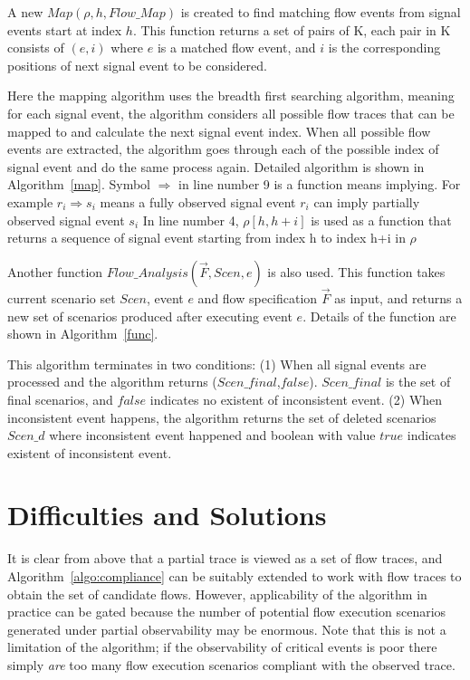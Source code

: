 \documentclass[12pt,frontmatter,copyright,thesis]{usfmanus}
\begin{document}
A new $Map(\rho, h, Flow\_Map)$ is created
to find matching flow events from 
signal events start at index $h$.
This function returns a set of pairs of K, each pair in K
consists of $(e, i)$ where $e$
is a matched flow event,
and $i$ is the corresponding positions of next signal event
to be considered. 

Here the mapping algorithm uses the breadth first searching algorithm,
meaning for each signal event, the algorithm considers all
possible flow traces that can be mapped to and calculate the next signal event index.
When all possible flow events are extracted, the algorithm
goes through each of the possible index of signal event and
do the same process again.
Detailed algorithm is shown in Algorithm~\ref{map}.
Symbol $\Rightarrow$ in line number 9 is a function means implying. For example $r_i \Rightarrow s_i$
means a fully observed signal event $r_i$ can imply partially observed signal event $s_i$
In line number 4, $\rho [h,h+i]$ is used as a function that returns a sequence of signal event starting from index h to index h+i in $\rho$

Another function $Flow\_Analysis(\vec{F},Scen,e)$ is
also used. This function takes current scenario set $Scen$, event $e$ and flow specification $\vec{F}$
as input, and returns a new set of scenarios produced after executing event $e$. Details
of the function are shown in Algorithm~\ref{func}.

This algorithm terminates in two conditions:
(1) When all signal events are processed and the algorithm returns
($Scen\_final$,$false$). $Scen\_final$ is the set of final scenarios, and $false$ indicates
no existent of inconsistent event.
(2) When inconsistent event happens, the algorithm returns the set of
deleted scenarios  $Scen\_d$ where inconsistent event happened and
boolean with value $true$ indicates existent of inconsistent event.









\clearpage
\section{Difficulties and Solutions}
It is clear from above that a partial trace is viewed as a
set of flow traces, and Algorithm~\ref{algo:compliance} can
be suitably extended to work with flow traces to obtain the
set of candidate flows.  However, applicability of the
algorithm in practice can be gated because the number of
potential flow execution scenarios generated under partial
observability may be enormous.  Note that this is not a
limitation of the algorithm; if the observability of
critical events is poor there simply {\em are} too many flow
execution scenarios compliant with the observed trace.
\end{document}
